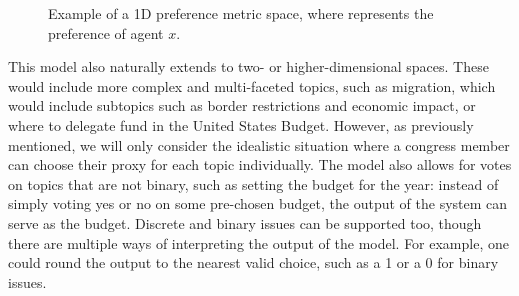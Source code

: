 \begin{figure}[htbp]
    \centering

    \caption{Example of a 1D preference metric space, where  represents the
    preference of agent $x$.}
    \label{fig:system-metric-space}
\end{figure}

This model also naturally extends to two- or higher-dimensional spaces.
These would include more complex and multi-faceted topics, such as migration, which
would include subtopics such as border restrictions and economic impact, or where to
delegate fund in the United States Budget.
However, as previously mentioned, we will only consider the idealistic
situation where a congress member can choose their proxy for each topic individually.
The model also allows for votes on topics that are not binary, such as setting the
budget for the year: instead of simply voting yes or no on some pre-chosen budget,
the output of the system can serve as the budget.
Discrete and binary issues can be supported too, though there are multiple ways of
interpreting the output of the model.
For example, one could round the output to the nearest valid choice, such as a 1 or a
0 for binary issues.



